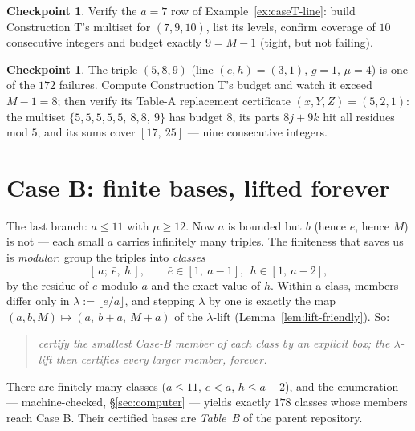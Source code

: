\documentclass[11pt,reqno]{amsart}
\theoremstyle{plain}
\theoremstyle{definition}
\newtheorem{checkpoint}[theorem]{Checkpoint}   %
\theoremstyle{remark}
\begin{document}
\begin{checkpoint}
Verify the $a = 7$ row of Example~\ref{ex:caseT-line}: build Construction T's
multiset for $(7, 9, 10)$, list its levels, confirm coverage of $10$ consecutive
integers and budget exactly $9 = M - 1$ (tight, but not failing).
\end{checkpoint}

\begin{checkpoint}
The triple $(5, 8, 9)$ (line $(e,h) = (3,1)$, $g = 1$, $\mu = 4$) is one of the
$172$ failures. Compute Construction T's budget and watch it exceed $M - 1 = 8$;
then verify its Table-A replacement certificate $(x, Y, Z) = (5, 2, 1)$: the
multiset $\{5,5,5,5,5,\ 8,8,\ 9\}$ has budget $8$, its parts $8j + 9k$ hit all
residues mod $5$, and its sums cover $[17,\ 25]$ --- nine consecutive integers.
\end{checkpoint}


\section{Case B: finite bases, lifted forever}\label{sec:caseB-friendly}

The last branch: $a \le 11$ with $\mu \ge 12$. Now $a$ is bounded but $b$ (hence
$e$, hence $M$) is not --- each small $a$ carries infinitely many triples. The
finiteness that saves us is \emph{modular}: group the triples into
\emph{classes}
\[
  [\,a;\ \bar e,\ h\,], \qquad \bar e \in [1,\ a-1],\ \ h \in [1,\ a-2] ,
\]
by the residue of $e$ modulo $a$ and the exact value of $h$. Within a class,
members differ only in $\lambda := \lfloor e/a \rfloor$, and stepping $\lambda$
by one is exactly the map $(a, b, M) \mapsto (a,\ b+a,\ M+a)$ of the
$\lambda$-lift (Lemma~\ref{lem:lift-friendly}). So:

\begin{quote}
\emph{certify the smallest Case-B member of each class by an explicit box; the
$\lambda$-lift then certifies every larger member, forever.}
\end{quote}

There are finitely many classes ($a \le 11$, $\bar e < a$, $h \le a - 2$), and
the enumeration --- machine-checked, \S\ref{sec:computer} --- yields exactly
$178$ classes whose members reach Case B. Their certified bases are
\emph{Table~B} of the parent repository.
\end{document}
